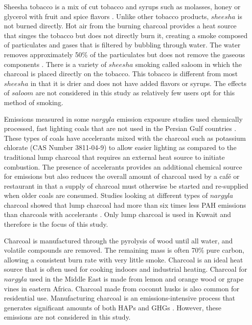 Sheesha tobacco is a mix of cut tobacco and syrups such as molasses, honey or glycerol with fruit and spice flavors \citep{Chaouachi2009}.  Unlike other tobacco products, $sheesha$ is not burned directly. Hot air from the burning charcoal provides a heat source that singes the tobacco but does not directly burn it, creating a smoke composed of particulates and gases \citep{Daher2010} that is filtered by bubbling through water.  The water removes approximately 50\% of the particulates but does not remove the gaseous components \citep{Becquemin2008}. There is a variety of $sheesha$ smoking called saloom in which the charcoal is placed directly on the tobacco. This tobacco is different from most $sheesha$ in that it is drier and does not have added flavors or syrups. The effects of $saloom$ are not considered in this study as relatively few users opt for this method of smoking.

Emissions measured in some $nargyla$ emission exposure studies used chemically processed, fast lighting coals that are not used in the Persian Gulf countries \citep{Daher2010, Shihadeh2005}.  These types of coals have accelerants mixed with the charcoal such as potassium chlorate (CAS Number 3811-04-9) \citep{MIC2012} to allow easier lighting as compared to the traditional lump charcoal that requires an external heat source to initiate combustion.  The presence of accelerants provides an additional chemical source for emissions but also reduces the overall amount of charcoal used by a caf\'e or restaurant in that a supply of charcoal must otherwise be started and re-supplied when older coals are consumed. Studies looking at different types of $nargyla$ charcoal showed that lump charcoal had more than six times less PAH emissions than charcoals with accelerants \citep{Sepetdjian2010}.  Only lump charcoal is used in Kuwait and therefore is the focus of this study.

Charcoal is manufactured through the pyrolysis of wood until all water, and volatile compounds are removed.  The remaining mass is often 70\% pure carbon, allowing a consistent burn rate with very little smoke. Charcoal is an ideal heat source that is often used for cooking indoors and industrial heating.  Charcoal for $nargyla$ used in the Middle East is made from lemon and orange wood or grape vines in eastern Africa.  Charcoal made from coconut husks is also common for residential use.  Manufacturing charcoal is an emissions-intensive process that generates significant amounts of both HAPs and GHGs \citep{Lacaux1994}.  However, these emissions are not considered in this study.


